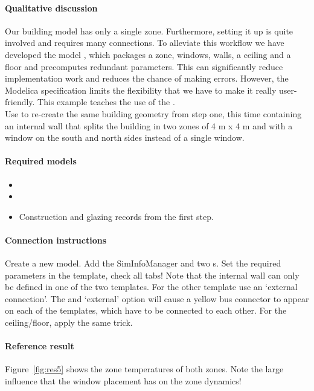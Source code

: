 \documentclass[10pt,a4paper]{article}
\begin{document}
\paragraph{Qualitative discussion}
Our building model has only a single zone. 
Furthermore, setting it up is quite involved and requires many connections.
To alleviate this workflow we have developed the model
, which packages a zone, 
windows, walls, a ceiling and a floor and precomputes redundant parameters.
This can significantly reduce implementation work and reduces the chance of making 
errors. 
However, the Modelica specification limits the flexibility that we have to make it really
user-friendly.
This example teaches the use of the .\\

Use  to re-create the same building geometry from
step one, this time containing an internal wall that splits the building in two
zones of 4 m x 4 m and with a window on the south and north sides instead of a single window.


\paragraph{Required models}
\begin{itemize}
\item {}
\item {}
\item Construction and glazing records from the first step.
\end{itemize}

\paragraph{Connection instructions}
Create a new model. Add the SimInfoManager and two s.
Set the required parameters in the template, check all tabs! 
Note that the internal wall can only be defined in one of the two templates.
For the other template use an `external connection'. 
The  and `external' option will cause a 
yellow bus connector to appear on each of the templates,
which have to be connected to each other.
For the ceiling/floor, apply the same trick.


\paragraph{Reference result}
Figure~\ref{fig:res5} shows the zone temperatures of both zones.
Note the large influence that the window placement has on the zone dynamics!
\end{document}
